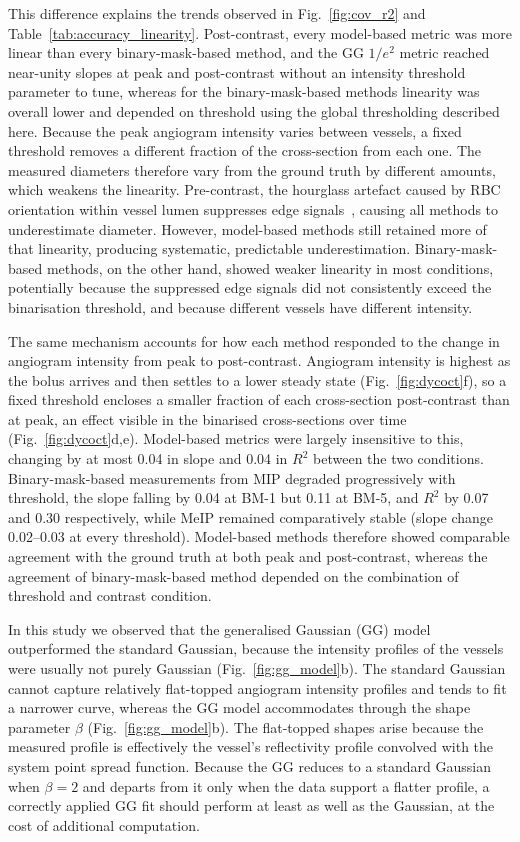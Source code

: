 This difference explains the trends observed in Fig.~\ref{fig:cov_r2} and Table~\ref{tab:accuracy_linearity}. Post-contrast, every model-based metric was more linear than every binary-mask-based method, and the GG $1/e^2$ metric reached near-unity slopes at peak and post-contrast without an intensity threshold parameter to tune, whereas for the binary-mask-based methods linearity was overall lower and depended on threshold using the global thresholding described here. Because the peak angiogram intensity varies between vessels, a fixed threshold removes a different fraction of the cross-section from each one. The measured diameters therefore vary from the ground truth by different amounts, which weakens the linearity. Pre-contrast, the hourglass artefact caused by RBC orientation within vessel lumen suppresses edge signals~\cite{cimallaShearFlowinducedOptical2011,bernucciInvestigationArtifactsRetinal2018}, causing all methods to underestimate diameter. However, model-based methods still retained more of that linearity, producing systematic, predictable underestimation. Binary-mask-based methods, on the other hand, showed weaker linearity in most conditions, potentially because the suppressed edge signals did not consistently exceed the binarisation threshold, and because different vessels have different intensity.

The same mechanism accounts for how each method responded to the change in angiogram intensity from peak to post-contrast. Angiogram intensity is highest as the bolus arrives and then settles to a lower steady state (Fig.~\ref{fig:dycoct}f), so a fixed threshold encloses a smaller fraction of each cross-section post-contrast than at peak, an effect visible in the binarised cross-sections over time (Fig.~\ref{fig:dycoct}d,e). Model-based metrics were largely insensitive to this, changing by at most 0.04 in slope and 0.04 in $R^2$ between the two conditions. Binary-mask-based measurements from MIP degraded progressively with threshold, the slope falling by 0.04 at BM-1 but 0.11 at BM-5, and $R^2$ by 0.07 and 0.30 respectively, while MeIP remained comparatively stable (slope change 0.02--0.03 at every threshold). Model-based methods therefore showed comparable agreement with the ground truth at both peak and post-contrast, whereas the agreement of binary-mask-based method depended on the combination of threshold and contrast condition.

In this study we observed that the generalised Gaussian (GG) model outperformed the standard Gaussian, because the intensity profiles of the vessels were usually not purely Gaussian (Fig.~\ref{fig:gg_model}b). The standard Gaussian cannot capture relatively flat-topped angiogram intensity profiles and tends to fit a narrower curve, whereas the GG model accommodates through the shape parameter $\beta$ (Fig.~\ref{fig:gg_model}b). The flat-topped shapes arise because the measured profile is effectively the vessel's reflectivity profile convolved with the system point spread function. Because the GG reduces to a standard Gaussian when $\beta = 2$ and departs from it only when the data support a flatter profile, a correctly applied GG fit should perform at least as well as the Gaussian, at the cost of additional computation.

